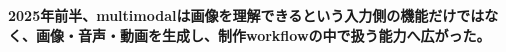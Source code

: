 \noindent\textbf{2025年前半、multimodalは画像を理解できるという入力側の機能だけではなく、画像・音声・動画を生成し、制作workflowの中で扱う能力へ広がった。}\autocite{src-877e7da88408,src-de4ffd746276,src-e68f8ce96685}
